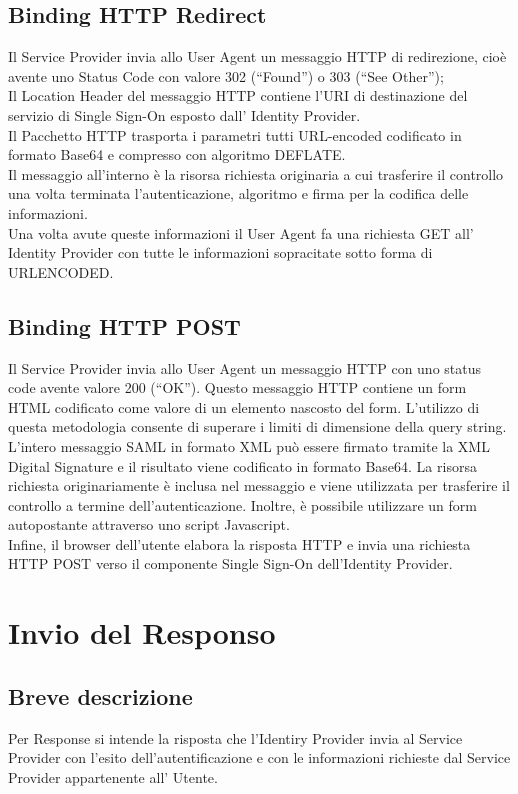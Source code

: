 \subsection{Binding HTTP Redirect}
Il Service Provider invia allo User Agent un messaggio HTTP di redirezione, cioè avente uno Status Code con
valore 302 (“Found”) o 303 (“See Other”);
\\ Il Location Header del messaggio HTTP contiene l’URI di destinazione del servizio di Single
Sign-On esposto dall’ Identity Provider.
\\ Il Pacchetto HTTP trasporta i parametri tutti URL-encoded codificato in formato
Base64 e compresso con algoritmo DEFLATE.
\\ Il messaggio all'interno è la risorsa richiesta originaria a cui 
trasferire il controllo una volta terminata l'autenticazione, 
algoritmo e firma per la codifica delle informazioni.
\\ Una volta avute queste informazioni il User Agent fa una 
richiesta GET all' Identity Provider con tutte le informazioni 
sopracitate sotto forma di URLENCODED.

\subsection{Binding HTTP POST}
Il Service Provider invia allo User Agent un messaggio HTTP con uno status code avente valore 200 (“OK”). 
Questo messaggio HTTP contiene un form HTML codificato come valore di un elemento nascosto del form. 
L'utilizzo di questa metodologia consente di superare i limiti di dimensione della query string. \\
L’intero messaggio SAML in formato XML può essere firmato tramite la XML Digital Signature e il risultato viene codificato 
in formato Base64. La risorsa richiesta originariamente è inclusa nel messaggio e viene utilizzata per trasferire il controllo 
a termine dell'autenticazione. Inoltre, è possibile utilizzare un form autopostante attraverso uno script Javascript. \\
Infine, il browser dell’utente elabora la risposta HTTP e invia una richiesta HTTP POST verso il componente Single Sign-On 
dell’Identity Provider.

\section{Invio del Responso}
\subsection{Breve descrizione}
Per Response si intende la risposta che l'Identiry Provider invia al Service Provider con 
l'esito dell'autentificazione e con le informazioni richieste dal Service Provider appartenente all' Utente.

